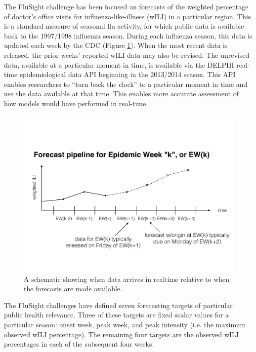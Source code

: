 \documentclass{article}
\begin{document}
The FluSight challenge has been focused on forecasts of the weighted percentage of doctor's office visits for influenza-like-illness (wILI) in a particular region. This is a standard measure of seasonal flu activity, for which public data is available back to the 1997/1998 influenza season. During each influenza season, this data is updated each week by the CDC (Figure \ref{fig:timezero-schematic}). When the most recent data is released, the prior weeks' reported wILI data may also be revised. The unrevised data, available at a particular moment in time, is available via the DELPHI real-time epidemiological data API beginning in the 2013/2014 season.\cite{DELPHI} This API enables researchers to ``turn back the clock'' to a particular moment in time and use the data available at that time. This enables more accurate assessment of how models would have performed in real-time. 

\begin{figure}[htbp]
\begin{center}
\includegraphics[width=\textwidth]{static-figures/timezero-sketch.pdf}
\caption{A schematic showing when data arrives in realtime relative to when the forecasts are made available.}
\label{fig:timezero-schematic}
\end{center}
\end{figure}


The FluSight challenges have defined seven forecasting targets of particular public health relevance. Three of these targets are fixed scalar values for a particular season: onset week, peak week, and peak intensity (i.e. the maximum observed wILI percentage). The remaining four targets are the observed wILI percentages in each of the subsequent four weeks. 
\end{document}
